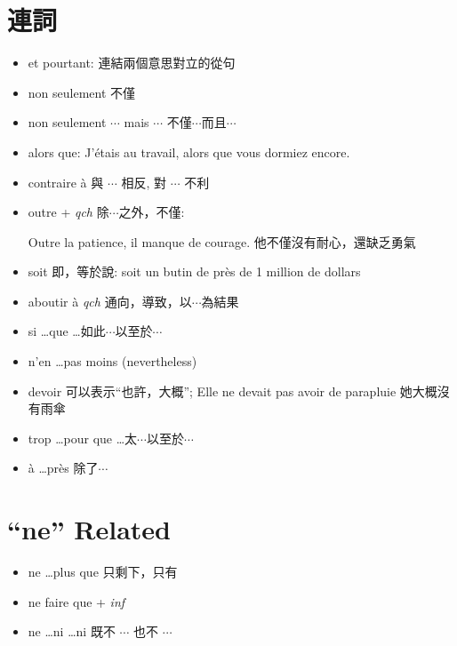 \documentclass{book}
\begin{document}
    \section{連詞}
        \begin{itemize}
            \item et pourtant: 連結兩個意思對立的從句
            \item non seulement 不僅
            \item non seulement $\cdots$ mais $\cdots$ 不僅$\cdots$而且$\cdots$
            \item alors que: J'étais au travail, alors que vous dormiez encore.
            \item contraire à 與 $\cdots$ 相反, 對 $\cdots$ 不利
            \item outre + \textit{qch} 除$\cdots$之外，不僅:
                \begin{center}
                    Outre la patience, il manque de courage. 他不僅沒有耐心，還缺乏勇氣
                \end{center}
            \item soit 即，等於說: soit un butin de près de 1 million de dollars
            \item aboutir à \textit{qch} 通向，導致，以$\cdots$為結果
            \item si \dots que \dots 如此$\cdots$以至於$\cdots$
            \item n'en \dots pas moins (nevertheless)
            \item devoir 可以表示``也許，大概''; Elle ne devait pas avoir de parapluie 她大概沒有雨傘
            \item trop \dots pour que \dots 太$\cdots$以至於$\cdots$
            \item à \dots près 除了$\cdots$
        \end{itemize}

    \section{``ne'' Related}
        \begin{itemize}
            \item ne \dots plus que 只剩下，只有
            \item ne faire que + \textit{inf}
            \item ne \dots ni \dots ni 既不 $\cdots$ 也不 $\cdots$
        \end{itemize}
\end{document}
